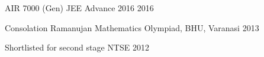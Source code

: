 
\begin{cvhonors}

  \cvhonor
    {AIR 7000 (Gen) } %
    {JEE Advance 2016} %
    {} %
    {2016} %

  \cvhonor
    {Consolation} %
    {Ramanujan Mathematics Olympiad, BHU, Varanasi} %
    {} %
    {2013} %

  \cvhonor
    {Shortlisted for second stage} %
    {NTSE} %
    {} %
    {2012} %

\end{cvhonors}
